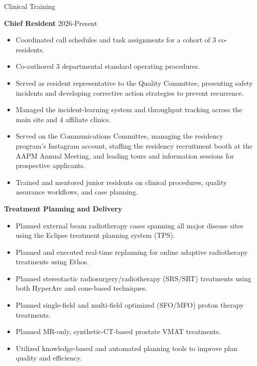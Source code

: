 \documentclass[
	11pt, %
]{resume} %
\begin{document}
\begin{rSection}{Clinical Training}

	\textbf{Chief Resident} \hfill 2026-Present
	\vspace{-.2cm}
	\begin{itemize}[label=$\cdot$]
		\itemsep-0.5em
		\item Coordinated call schedules and task assignments for a cohort of 3 co-residents.
		\item Co-authored 3 departmental standard operating procedures.
		\item Served as resident representative to the Quality Committee, presenting safety incidents and developing corrective action strategies to prevent recurrence.
		\item Managed the incident-learning system and throughput tracking across the main site and 4 affiliate clinics.
		\item Served on the Communications Committee, managing the residency program's Instagram account, staffing the residency recruitment booth at the AAPM Annual Meeting, and leading tours and information sessions for prospective applicants.
		\item Trained and mentored junior residents on clinical procedures, quality assurance workflows, and case planning.
	\end{itemize}

\newpage
	\textbf{Treatment Planning and Delivery}
	\vspace{-.2cm}
	\begin{itemize}[label=$\cdot$]
		\itemsep-0.5em
		\item Planned external beam radiotherapy cases spanning all major disease sites using the Eclipse treatment planning system (TPS).
		\item Planned and executed real-time replanning for online adaptive radiotherapy treatments using Ethos.
		\item Planned stereotactic radiosurgery/radiotherapy (SRS/SRT) treatments using both HyperArc and cone-based techniques.
		\item Planned single-field and multi-field optimized (SFO/MFO) proton therapy treatments.
		\item Planned MR-only, synthetic-CT-based prostate VMAT treatments.
		\item Utilized knowledge-based and automated planning tools to improve plan quality and efficiency.
	\end{itemize}


\end{rSection}
\end{document}
